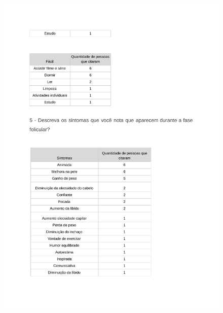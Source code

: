 \begin{apendicesenv}
    \begin{figure}[h]
        \centering
        \includegraphics[keepaspectratio=true,scale=0.7]{figuras/Tab18.pdf}
    \end{figure}
    

\end{apendicesenv}
